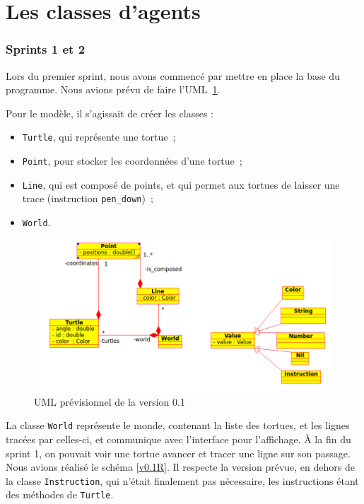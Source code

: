 \section{Les classes d'agents}
\subsubsection{Sprints 1 et 2}
Lors du premier sprint, nous avons commencé par mettre en place la base du programme. Nous avions prévu de faire l'UML~\ref{v0.1}.

 Pour le modèle, il s'agissait de créer les classes :
\begin{itemize}
\item \verb|Turtle|, qui représente une tortue~;
\item \verb|Point|, pour stocker les coordonnées d'une tortue~;
\item \verb|Line|, qui est composé de points, et qui permet aux tortues de laisser une trace (instruction \verb|pen_down|)~;
\item \verb|World|.
\end{itemize}


\begin{figure}[h]
\includegraphics[scale=0.5]{doc/report/uml/v01.png}
\caption{\label{v0.1} UML prévisionnel de la version 0.1}
\end{figure}


La classe \verb|World| représente le monde, contenant la liste des tortues, et les lignes tracées par celles-ci, et communique avec l'interface pour l'affichage.
À la fin du sprint 1, on pouvait voir une tortue avancer et tracer une ligne sur son passage.
Nous avions réalisé le schéma \ref{v0.1R}. Il respecte la version prévue, en dehors de la classe \verb|Instruction|, qui n'était finalement pas nécessaire, les instructions étant des méthodes de \verb|Turtle|.

